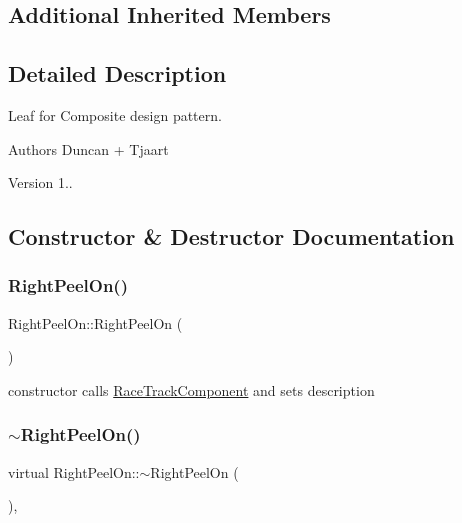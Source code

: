 \subsection*{Additional Inherited Members}


\subsection{Detailed Description}
Leaf for Composite design pattern. 

\begin{DoxyAuthor}{Authors}
Duncan + Tjaart 
\end{DoxyAuthor}
\begin{DoxyVersion}{Version}
1.. 
\end{DoxyVersion}


\subsection{Constructor \& Destructor Documentation}
\mbox{\label{class_right_peel_on_a99584752f686b5d5540b2a5a032248c1}} 
\subsubsection{\texorpdfstring{Right\+Peel\+On()}{RightPeelOn()}}
{\footnotesize\ttfamily Right\+Peel\+On\+::\+Right\+Peel\+On (\begin{DoxyParamCaption}{ }\end{DoxyParamCaption})\hspace{0.3cm}{\ttfamily [inline]}}

constructor calls \mbox{\hyperlink{class_race_track_component}{Race\+Track\+Component}} and sets description \mbox{\label{class_right_peel_on_a46a1e94121c8fb13ba7189e4d28c551f}} 
\subsubsection{\texorpdfstring{$\sim$\+Right\+Peel\+On()}{~RightPeelOn()}}
{\footnotesize\ttfamily virtual Right\+Peel\+On\+::$\sim$\+Right\+Peel\+On (\begin{DoxyParamCaption}{ }\end{DoxyParamCaption})\hspace{0.3cm}{\ttfamily [inline]}, {\ttfamily [virtual]}}

